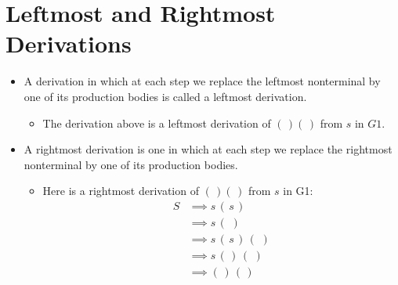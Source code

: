 \documentclass[]{article}
\begin{document}
\section{Leftmost and Rightmost Derivations}
  \begin{itemize}
    \item A derivation in which at each step we replace the leftmost nonterminal
    by one of its production bodies is called a leftmost derivation.
      \begin{itemize}
        \item The derivation above is a leftmost derivation of $(\,)(\,)$ from
        $s$ in $G1$.
      \end{itemize}
    \item A rightmost derivation is one in which at each step we replace the
    rightmost nonterminal by one of its production bodies.
      \begin{itemize}
        \item Here is a rightmost derivation of $(\,)(\,)$ from $s$ in G1:
          \begin{align*}
            S & \implies s \, (\,s\,)            \\
              & \implies s \, (\,\,)             \\
              & \implies s \, (\,s\,) \, (\,\,)  \\
              & \implies s \, (\,   ) \, (\,\,)  \\
              & \implies      (\,   ) \, (\,   ) \\ 
          \end{align*}
      \end{itemize}
  \end{itemize}
  
\end{document}
